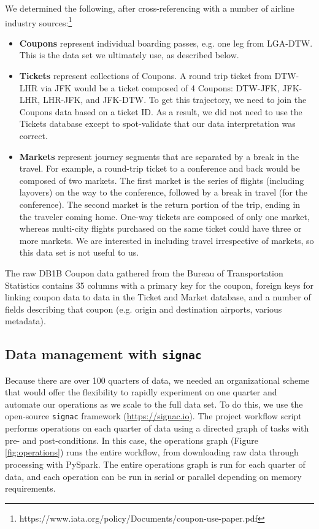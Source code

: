 \documentclass[sigconf]{acmart}
\begin{document}
We determined the following, after cross-referencing with a number of airline industry sources:\footnote{https://www.iata.org/policy/Documents/coupon-use-paper.pdf}
\begin{itemize}
    \item \textbf{Coupons} represent individual boarding passes, e.g. one leg from LGA-DTW. This is the data set we ultimately use, as described below.
    \item \textbf{Tickets} represent collections of Coupons. A round trip ticket from DTW-LHR via JFK would be a ticket composed of 4 Coupons: DTW-JFK, JFK-LHR, LHR-JFK, and JFK-DTW. To get this trajectory, we need to join the Coupons data based on a ticket ID. As a result, we did not need to use the Tickets database except to spot-validate that our data interpretation was correct.
    \item \textbf{Markets} represent journey segments that are separated by a break in the travel. For example, a round-trip ticket to a conference and back would be composed of two markets. The first market is the series of flights (including layovers) on the way to the conference, followed by a break in travel (for the conference). The second market is the return portion of the trip, ending in the traveler coming home. One-way tickets are composed of only one market, whereas multi-city flights purchased on the same ticket could have three or more markets. We are interested in including travel irrespective of markets, so this data set is not useful to us. %
\end{itemize}

The raw DB1B Coupon data gathered from the Bureau of Transportation Statistics contains 35 columns with a primary key for the coupon, foreign keys for linking coupon data to data in the Ticket and Market database, and a number of fields describing that coupon (e.g. origin and destination airports, various metadata).

\subsection{Data management with \texttt{signac}}
Because there are over 100 quarters of data, we needed an organizational scheme that would offer the flexibility to rapidly experiment on one quarter and automate our operations as we scale to the full data set. To do this, we use the open-source \texttt{signac} framework (\url{https://signac.io}). The project workflow script performs operations on each quarter of data using a directed graph of tasks with pre- and post-conditions. In this case, the operations graph (Figure \ref{fig:operations}) runs the entire workflow, from downloading raw data through processing with PySpark. The entire operations graph is run for each quarter of data, and each operation can be run in serial or parallel depending on memory requirements.
\end{document}
